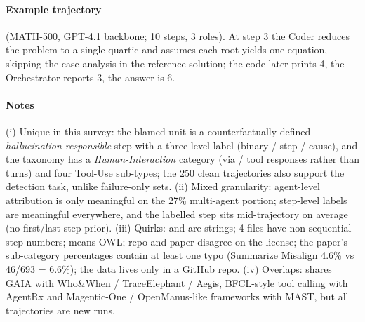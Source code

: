 \paragraph{Example trajectory}  (MATH-500, GPT-4.1 backbone; 10 steps, 3 roles). At step 3 the Coder reduces the problem to a single quartic and assumes each root yields one equation, skipping the case analysis in the reference solution; the code later prints 4, the Orchestrator reports 3, the answer is 6.


\paragraph{Notes} (i) Unique in this survey: the blamed unit is a counterfactually defined \emph{hallucination-responsible} step with a three-level label (binary / step / cause), and the taxonomy has a \emph{Human-Interaction} category (via  /  tool responses rather than  turns) and four Tool-Use sub-types; the 250 clean trajectories also support the detection task, unlike failure-only sets. (ii) Mixed granularity: agent-level attribution is only meaningful on the 27\% multi-agent portion; step-level labels are meaningful everywhere, and the labelled step sits mid-trajectory on average (no first/last-step prior). (iii) Quirks:  and  are strings; 4 files have non-sequential step numbers;  means OWL; repo and paper disagree on the license; the paper's sub-category percentages contain at least one typo (Summarize Misalign 4.6\% vs 46/693 = 6.6\%); the data lives only in a GitHub repo. (iv) Overlaps: shares GAIA with Who\&When / TraceElephant / Aegis, BFCL-style tool calling with AgentRx and Magentic-One / OpenManus-like frameworks with MAST, but all trajectories are new runs.
